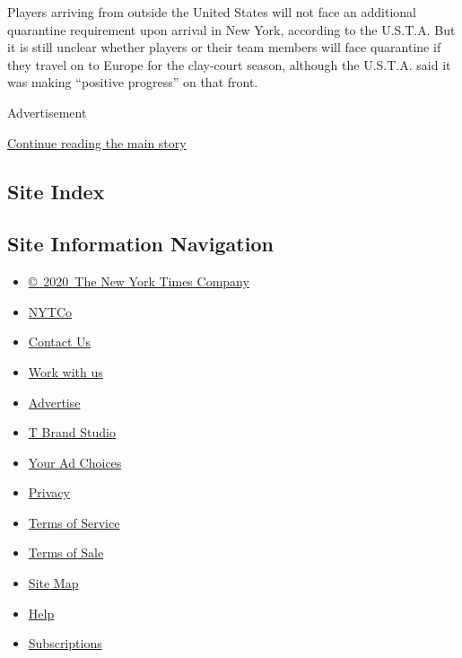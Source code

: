 Players arriving from outside the United States will not face an
additional quarantine requirement upon arrival in New York, according to
the U.S.T.A. But it is still unclear whether players or their team
members will face quarantine if they travel on to Europe for the
clay-court season, although the U.S.T.A. said it was making ``positive
progress'' on that front.

Advertisement

\protect\hyperlink{after-bottom}{Continue reading the main story}

\hypertarget{site-index}{%
\subsection{Site Index}\label{site-index}}

\hypertarget{site-information-navigation}{%
\subsection{Site Information
Navigation}\label{site-information-navigation}}

\begin{itemize}
\tightlist
\item
  \href{https://help.nytimes.com/hc/en-us/articles/115014792127-Copyright-notice}{©~2020~The
  New York Times Company}
\end{itemize}

\begin{itemize}
\tightlist
\item
  \href{https://www.nytco.com/}{NYTCo}
\item
  \href{https://help.nytimes.com/hc/en-us/articles/115015385887-Contact-Us}{Contact
  Us}
\item
  \href{https://www.nytco.com/careers/}{Work with us}
\item
  \href{https://nytmediakit.com/}{Advertise}
\item
  \href{http://www.tbrandstudio.com/}{T Brand Studio}
\item
  \href{https://www.nytimes.com/privacy/cookie-policy\#how-do-i-manage-trackers}{Your
  Ad Choices}
\item
  \href{https://www.nytimes.com/privacy}{Privacy}
\item
  \href{https://help.nytimes.com/hc/en-us/articles/115014893428-Terms-of-service}{Terms
  of Service}
\item
  \href{https://help.nytimes.com/hc/en-us/articles/115014893968-Terms-of-sale}{Terms
  of Sale}
\item
  \href{https://spiderbites.nytimes.com}{Site Map}
\item
  \href{https://help.nytimes.com/hc/en-us}{Help}
\item
  \href{https://www.nytimes.com/subscription?campaignId=37WXW}{Subscriptions}
\end{itemize}
